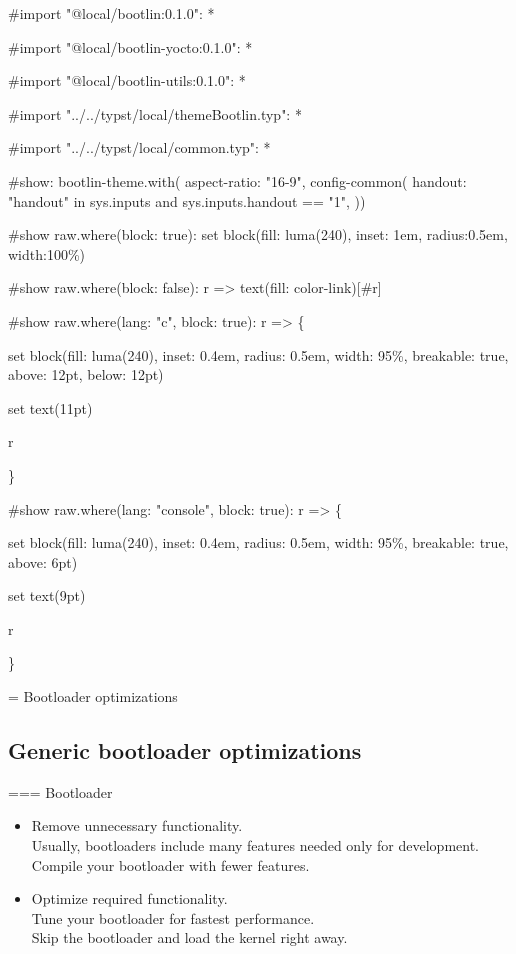 #import "@local/bootlin:0.1.0": * 

#import "@local/bootlin-yocto:0.1.0": *

#import "@local/bootlin-utils:0.1.0": *

#import "../../typst/local/themeBootlin.typ": *

#import "../../typst/local/common.typ": *

#show: bootlin-theme.with(
  aspect-ratio: "16-9",
config-common(
  handout: "handout" in sys.inputs and sys.inputs.handout == "1",
))

#show raw.where(block: true): set block(fill: luma(240), inset: 1em, radius:0.5em, width:100\%) 

#show raw.where(block: false): r => { text(fill: color-link)[#r] } 

#show raw.where(lang: "c", block: true): r => \{

set block(fill: luma(240),
inset: 0.4em,
radius: 0.5em,
width: 95\%, breakable: true, above: 12pt, below: 12pt)

set text(11pt)

r

\} 


#show raw.where(lang: "console", block: true): r => \{

set block(fill: luma(240),
inset: 0.4em,
radius: 0.5em,
width: 95\%, breakable: true, above: 6pt)

set text(9pt)

r

\} 

 = Bootloader optimizations

\subsection{Generic bootloader optimizations}

=== Bootloader
\begin{itemize}

\item Remove unnecessary functionality.\\
      Usually, bootloaders include many features needed only for
      development. Compile your bootloader with fewer features.
\item Optimize required functionality.\\
      Tune your bootloader for fastest performance. \\
      Skip the bootloader and load the kernel right away.
\end{itemize}


